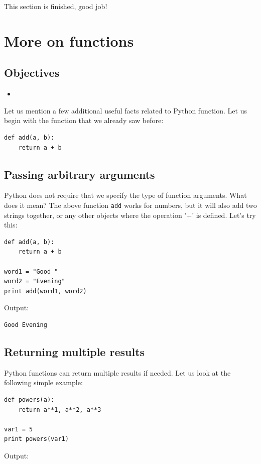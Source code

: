 \documentclass[article,A4,12pt]{llncs}
\begin{document}
\noindent
This section is finished, good job!

\section{More on functions}

\subsection{Objectives}

\begin{itemize}
\item
\end{itemize}

Let us mention a few additional useful facts related to 
Python function. Let us begin with the function that we already saw
before:

\begin{verbatim}
def add(a, b):
    return a + b
\end{verbatim}

\subsection{Passing arbitrary arguments}

Python does not require that we specify the type of function arguments. 
What does it mean? The above function {\tt add} works for 
numbers, but it will also add two strings together, or any other 
objects where the operation '+' is defined. Let's try this:

\begin{verbatim}
def add(a, b):
    return a + b

word1 = "Good "
word2 = "Evening"
print add(word1, word2)
\end{verbatim}
Output:

\begin{verbatim}
Good Evening
\end{verbatim}

\subsection{Returning multiple results}

Python functions can return multiple results if needed.
Let us look at the following simple example:

\begin{verbatim}
def powers(a):
    return a**1, a**2, a**3

var1 = 5
print powers(var1)
\end{verbatim}
Output:
\end{document}
